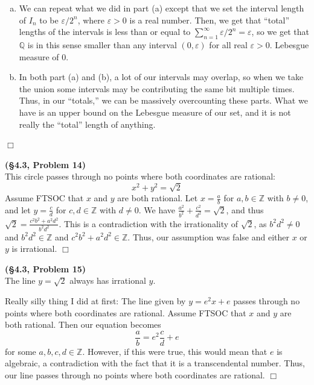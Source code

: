 \documentclass[12pt]{article}
\theoremstyle{definition}
\newenvironment{Solution}{\noindent {\sc Solution.}}{$\Box$ \vspace{2 ex}}
\begin{document}
\begin{Solution}
\begin{enumerate}[(a)]
\item We can repeat what we did in part (a) except that we set the interval length of $I_n$ to be $\varepsilon / 2^n$, where $\varepsilon >0$ is a real number. Then, we get that ``total'' lengths of the intervals is less than or equal to $\sum_{n=1}^\infty \varepsilon/2^n = \varepsilon$, so we get that $\mathbb Q$ is in this sense smaller than any interval $(0,\varepsilon)$ for all real $\varepsilon >0$. Lebesgue measure of 0.
\item In both part (a) and (b), a lot of our intervals may overlap, so when we take the union some intervals may be contributing the same bit multiple times. Thus, in our ``totals,'' we can be massively overcounting these parts. What we have is an upper bound on the Lebesgue measure of our set, and it is not really the ``total'' length of anything.
\end{enumerate}
\end{Solution}

\vspace{0.5cm}

\begin{Solution}
{\bf (\S4.3, Problem 14)}\\
This circle passes through no points where both coordinates are rational:
\[x^2 +y^2 =\sqrt{2} \]
Assume FTSOC that $x$ and $y$ are both rational. Let $x = \frac{a}{b}$ for $a,b\in \mathbb Z$ with $b\ne 0$, and let $y=\frac{c}{d}$ for $c,d\in \mathbb Z$ with $d\ne 0$. We have $\frac{a^2}{b^2} +\frac{c^2}{d^2} = \sqrt{2}$, and thus $\sqrt{2} = \frac{c^2 b^2 + a^2 d^2}{b^2 d^2}$. This is a contradiction with the irrationality of $\sqrt{2}$, as $b^2 d^2 \ne 0$ and $b^2 d^2 \in \mathbb Z$ and $c^2 b^2 + a^2 d^2 \in \mathbb Z$. Thus, our assumption was false and either $x$ or $y$ is irrational.
\end{Solution}

\vspace{0.5cm}

\begin{Solution}
{\bf (\S4.3, Problem 15)}\\
The line $y=\sqrt{2}$ always has irrational $y$.

Really silly thing I did at first: The line given by $y = e^2x+e$ passes through no points where both coordinates are rational. Assume FTSOC that $x$ and $y$ are both rational. Then our equation becomes \[\frac{a}{b} = e^2  \frac{c}{d}+e\] for some $a,b,c,d\in \mathbb Z$. However, if this were true, this would mean that $e$ is algebraic, a contradiction with the fact that it is a transcendental number. Thus, our line passes through no points where both coordinates are rational.
\end{Solution}
\end{document}
